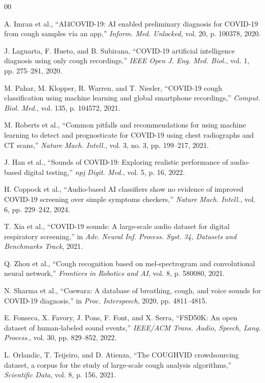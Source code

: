 \begin{thebibliography}{00}

A. Imran et al., ``AI4COVID-19: AI enabled preliminary diagnosis for COVID-19 from cough samples via an app,'' \emph{Inform. Med. Unlocked}, vol. 20, p. 100378, 2020.

J. Laguarta, F. Hueto, and B. Subirana, ``COVID-19 artificial intelligence diagnosis using only cough recordings,'' \emph{IEEE Open J. Eng. Med. Biol.}, vol. 1, pp. 275--281, 2020.

M. Pahar, M. Klopper, R. Warren, and T. Niesler, ``COVID-19 cough classification using machine learning and global smartphone recordings,'' \emph{Comput. Biol. Med.}, vol. 135, p. 104572, 2021.

M. Roberts et al., ``Common pitfalls and recommendations for using machine learning to detect and prognosticate for COVID-19 using chest radiographs and CT scans,'' \emph{Nature Mach. Intell.}, vol. 3, no. 3, pp. 199--217, 2021.

J. Han et al., ``Sounds of COVID-19: Exploring realistic performance of audio-based digital testing,'' \emph{npj Digit. Med.}, vol. 5, p. 16, 2022.

H. Coppock et al., ``Audio-based AI classifiers show no evidence of improved COVID-19 screening over simple symptoms checkers,'' \emph{Nature Mach. Intell.}, vol. 6, pp. 229--242, 2024.

T. Xia et al., ``COVID-19 sounds: A large-scale audio dataset for digital respiratory screening,'' in \emph{Adv. Neural Inf. Process. Syst. 34, Datasets and Benchmarks Track}, 2021.

Q. Zhou et al., ``Cough recognition based on mel-spectrogram and convolutional neural network,'' \emph{Frontiers in Robotics and AI}, vol. 8, p. 580080, 2021.

N. Sharma et al., ``Coswara: A database of breathing, cough, and voice sounds for COVID-19 diagnosis,'' in \emph{Proc. Interspeech}, 2020, pp. 4811--4815.

E. Fonseca, X. Favory, J. Pons, F. Font, and X. Serra, ``FSD50K: An open dataset of human-labeled sound events,'' \emph{IEEE/ACM Trans. Audio, Speech, Lang. Process.}, vol. 30, pp. 829--852, 2022.

L. Orlandic, T. Teijeiro, and D. Atienza, ``The COUGHVID crowdsourcing dataset, a corpus for the study of large-scale cough analysis algorithms,'' \emph{Scientific Data}, vol. 8, p. 156, 2021.


\end{thebibliography}
